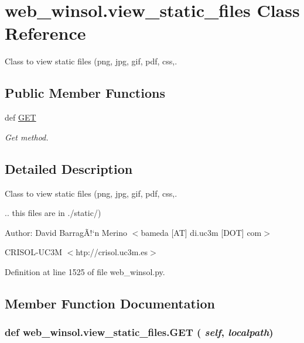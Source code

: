 \hypertarget{classweb__winsol_1_1view__static__files}{
\section{web\_\-winsol.view\_\-static\_\-files Class Reference}
\label{classweb__winsol_1_1view__static__files}
}
Class to view static files (png, jpg, gif, pdf, css,.  


\subsection*{Public Member Functions}
\begin{CompactItemize}
\item 
def \hyperlink{classweb__winsol_1_1view__static__files_2df2ad27dac5df35381b80b6fd49498f}{GET}
\begin{CompactList}\small\item\em Get method. \item\end{CompactList}\end{CompactItemize}


\subsection{Detailed Description}
Class to view static files (png, jpg, gif, pdf, css,. 

.. this files are in ./static/)

\begin{Desc}
\item[Author:]David Barrag\~{A}!`n Merino $<$bameda \mbox{[}AT\mbox{]} di.uc3m \mbox{[}DOT\mbox{]} com$>$ 

CRISOL-UC3M $<$htp://crisol.uc3m.es$>$ \end{Desc}




Definition at line 1525 of file web\_\-winsol.py.

\subsection{Member Function Documentation}
\hypertarget{classweb__winsol_1_1view__static__files_2df2ad27dac5df35381b80b6fd49498f}{
\subsubsection[GET]{\setlength{\rightskip}{0pt plus 5cm}def web\_\-winsol.view\_\-static\_\-files.GET ( {\em self},  {\em localpath})}}
\label{classweb__winsol_1_1view__static__files_2df2ad27dac5df35381b80b6fd49498f}


